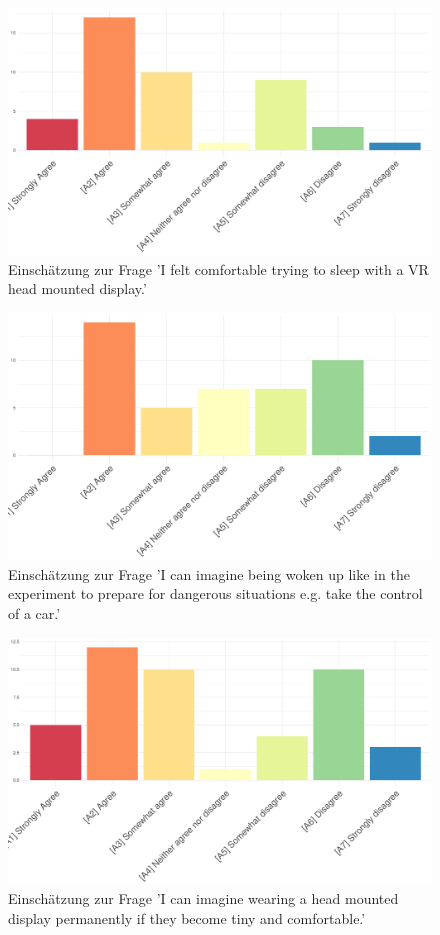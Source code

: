 \begin{figure}[H]
	\centering
	\includegraphics[width=\textwidth]{./_StudyResults/comfortableHeadset}
	\caption{Einschätzung zur Frage 'I felt comfortable trying to sleep with a VR head mounted display.'}
	\label{fig:comfortableHeadset}
\end{figure}


\begin{figure}[H]
	\centering
	\includegraphics[width=\textwidth]{./_StudyResults/imagineWakingUp}
	\caption{Einschätzung zur Frage 'I can imagine being woken up like in the experiment to prepare for dangerous situations e.g. take the control of a car.'}
	\label{fig:imagineWakingUp}
\end{figure}


\begin{figure}[H]
	\centering
	\includegraphics[width=\textwidth]{./_StudyResults/permanentWearing}
	\caption{Einschätzung zur Frage 'I can imagine wearing a head mounted display permanently if they become tiny and comfortable.'}
	\label{fig:permanentWearing}
\end{figure}
